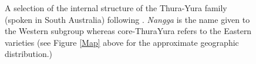 	\begin{figure}[h]\centering
		\caption{A selection of the internal structure of the Thura-Yura family (spoken in South Australia) following \citealt[183]{Simpson2004}. \textit{Nangga} is the name given to the Western subgroup whereas core-ThuraYura refers to the Eastern varieties (see Figure \ref{Map} above for the approximate geographic distribution.)}\label{TY-tree}\small
	\end{figure}
